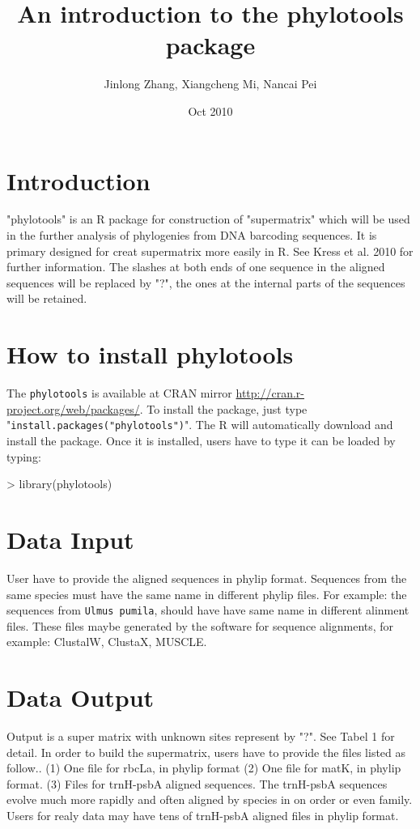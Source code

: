\documentclass[12pt]{article}
\title{An introduction to the phylotools package}
\author{ Jinlong Zhang, Xiangcheng Mi, Nancai Pei}
\date{Oct 2010}
\begin{document}
\maketitle

\tableofcontents

\section{Introduction}

"phylotools" is an R package for construction of "supermatrix" which will be used in the further analysis of phylogenies from DNA barcoding sequences. It is primary designed for creat supermatrix more easily in R. See Kress et al. 2010 for further information.
The slashes at both ends of one sequence in the aligned sequences will be replaced by "?", the ones at the internal parts of the sequences will be retained. 


\section{How to install phylotools}

The \texttt{phylotools} is available at CRAN mirror \url{http://cran.r-project.org/web/packages/}. To install the package, just type "\texttt{install.packages("phylotools")}".
The R will automatically download and install the package. Once it is installed, users have to type it can be loaded by typing:

\begin{Schunk}
\begin{Sinput}
> library(phylotools)
\end{Sinput}
\end{Schunk}



\section{Data Input}
User have to provide the aligned sequences in phylip format. Sequences from the same species must have the same name in different phylip files. For example: the sequences from \texttt{Ulmus pumila}, should have have same name in different alinment files. These files maybe generated by the software for sequence alignments, for example: ClustalW, ClustaX, MUSCLE.

\section{Data Output}
Output is a super matrix with unknown sites represent by "?". See Tabel 1 for detail.
In order to build the supermatrix, users have to provide the files listed as follow.. 
(1)  One file for rbcLa, in phylip format
(2)  One file for matK, in phylip format.
(3)  Files for trnH-psbA aligned sequences. The trnH-psbA sequences evolve much more rapidly and often aligned by species in on order or even family. Users for realy data may have tens of trnH-psbA aligned files in phylip format.
\end{document}
